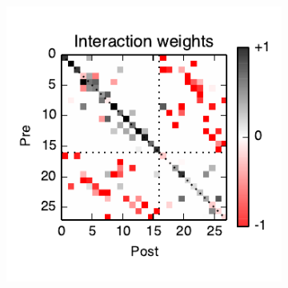 \documentclass[aos,noinfoline]{imsart} %
\begin{document}
\begin{figure}[t!]
  \centering%
  \vspace{-0.5em}
  \begin{subfigure}[T]{2.2in}
    \includegraphics[width=\textwidth]{figure1a}
  \end{subfigure}
  ~
  \begin{subfigure}[T]{1.4in}

\end{subfigure}
\end{figure}
\end{document}
